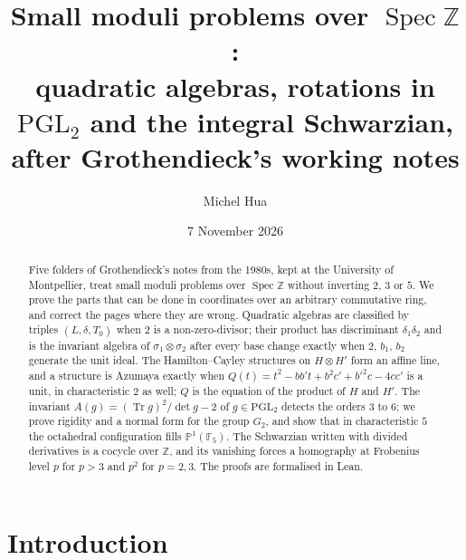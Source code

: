 \documentclass[11pt,a4paper]{amsart}
\title[Small moduli over $\mathrm{Spec}\,\mathbb Z$]{Small moduli problems over $\operatorname{Spec}\mathbb Z$:\\ quadratic algebras, rotations in $\mathrm{PGL}_2$ and the integral Schwarzian,\\ after Grothendieck's working notes}
\author{Michel Hua}
\date{7 November 2026}
\theoremstyle{definition}
\theoremstyle{remark}
\newcommand{\Z}{\mathbb Z}
\newcommand{\F}{\mathbb F}
\newcommand{\PGL}{\mathrm{PGL}_2}
\newcommand{\Tr}{\operatorname{Tr}}
\begin{document}
\begin{abstract}
Five folders of Grothendieck's notes from the 1980s, kept at the University of Montpellier, treat small moduli problems over $\operatorname{Spec}\Z$ without inverting $2$, $3$ or $5$. We prove the parts that can be done in coordinates over an arbitrary commutative ring, and correct the pages where they are wrong. Quadratic algebras are classified by triples $(L, \delta, T_0)$ when $2$ is a non-zero-divisor; their product has discriminant $\delta_1\delta_2$ and is the invariant algebra of $\sigma_1\otimes\sigma_2$ after every base change exactly when $2$, $b_1$, $b_2$ generate the unit ideal. The Hamilton--Cayley structures on $H\otimes H'$ form an affine line, and a structure is Azumaya exactly when $Q(t) = t^2 - bb't + b^2c' + b'^2c - 4cc'$ is a unit, in characteristic $2$ as well; $Q$ is the equation of the product of $H$ and $H'$. The invariant $A(g) = (\Tr g)^2/\det g - 2$ of $g \in \PGL$ detects the orders $3$ to $6$; we prove rigidity and a normal form for the group $G_2$, and show that in characteristic $5$ the octahedral configuration fills $\mathbb P^1(\F_5)$. The Schwarzian written with divided derivatives is a cocycle over $\Z$, and its vanishing forces a homography at Frobenius level $p$ for $p > 3$ and $p^2$ for $p = 2, 3$. The proofs are formalised in Lean.
\end{abstract}

\maketitle

\section{Introduction}
\end{document}
